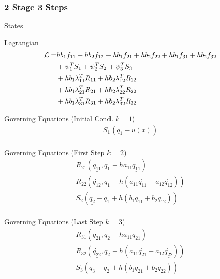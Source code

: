\documentclass{beamer}
\begin{document}
\begin{frame}[allowframebreaks] \frametitle{2 Stage 3 Steps}

\begin{block}{States}
\end{block}

\begin{block}{Lagrangian}
  \begin{equation}\nonumber
    \begin{split}
      {\cal{L}} = &  hb_1f_{11} + hb_2f_{12} + hb_1f_{21} + hb_2f_{22}  + hb_1f_{31} + hb_2f_{32} \\
      & + \psi_1^T S_1 + \psi_2^T S_2 + \psi_3^T S_3 \\
      & + h b_1 \lambda_{11}^TR_{11} + h b_2 \lambda_{12}^TR_{12} \\
      & + h b_1 \lambda_{21}^TR_{21} + h b_2 \lambda_{22}^TR_{22} \\
      & + h b_1 \lambda_{31}^TR_{31} + h b_2 \lambda_{32}^TR_{32}
    \end{split}
  \end{equation}
\end{block}

\framebreak

\begin{block}{Governing Equations (Initial Cond. $k=1$)}
\begin{eqnarray}\nonumber
S_1({q_1} - u(x))\\\nonumber
\end{eqnarray}
\end{block}

\begin{block}{Governing Equations (First Step $k=2$)}
\begin{eqnarray}\nonumber
R_{21}\left( \underline{\dot{q_{11}}}, q_1 + h a_{11} \underline{\dot{q_{11}}}  \right)\\ \nonumber
R_{22}( \underline{\dot{q_{12}}}, q_1 + h (a_{11} \dot{q_{11}} + a_{12} \underline{\dot{q_{12}}}) )\\ \nonumber
S_2(\underline{q_2} - q_1 + h ( b_1\dot{q_{11}} + b_2\dot{q_{12}} ))\\\nonumber
\end{eqnarray}
\end{block}

\begin{block}{Governing Equations (Last Step $k=3$)}
\begin{eqnarray}\nonumber
R_{31}\left( \underline{\dot{q_{21}}}, q_2 + h a_{11} \underline{\dot{q_{21}}}  \right)\\ \nonumber
R_{32}( \underline{\dot{q_{22}}}, q_2 + h (a_{11} \dot{q_{21}} + a_{12} \underline{\dot{q_{22}}}) )\\ \nonumber
S_3(\underline{q_3} - q_2 + h ( b_1\dot{q_{21}} + b_2\dot{q_{22}} ))\\\nonumber
\end{eqnarray}
\end{block}

\end{frame}
\end{document}
